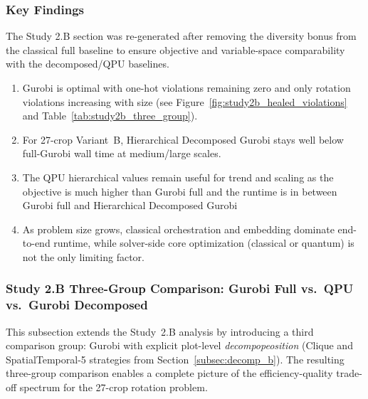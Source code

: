 \documentclass{oqireport}
\begin{document}
\subsubsection{Key Findings}

The Study 2.B section was re-generated after removing the diversity bonus from the
classical full baseline to ensure objective and variable-space comparability with
the decomposed/QPU baselines.

\begin{enumerate}[label=\textbf{Result \arabic*.}, leftmargin=*, align=left, itemsep=1em]


\item 
Gurobi is optimal with one-hot violations remaining zero and only
rotation violations increasing with size (see Figure~\ref{fig:study2b_healed_violations}
and Table~\ref{tab:study2b_three_group}).

\item

For 27-crop Variant~B, Hierarchical Decomposed Gurobi stays well below full-Gurobi wall time at medium/large scales.

\item

The QPU hierarchical values remain useful for trend and scaling as the objective is much higher than Gurobi full and the runtime is in between Gurobi full and Hierarchical Decomposed Gurobi

\item

As problem size grows,
classical orchestration and embedding dominate end-to-end runtime, while solver-side
core optimization (classical or quantum) is not the only limiting factor.

\end{enumerate}


\subsubsection{Study 2.B Three-Group Comparison: Gurobi Full vs.\ QPU vs.\ Gurobi Decomposed}
\label{subsec:study2b_three_group}

This subsection extends the Study~2.B analysis by introducing a third comparison group:
Gurobi with explicit plot-level \emph{decompopeosition} (Clique and SpatialTemporal-5 strategies
from Section~\ref{subsec:decomp_b}).  The resulting three-group comparison enables a complete
picture of the efficiency-quality trade-off spectrum for the 27-crop rotation problem.
\end{document}

